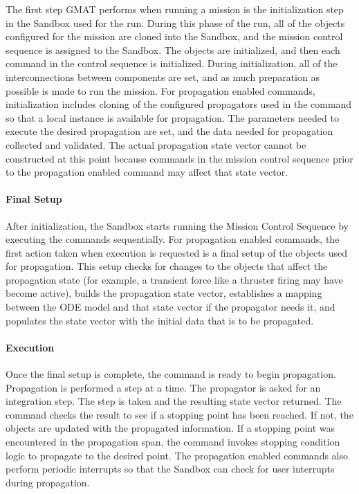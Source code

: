 \documentclass[10pt]{article}
\begin{document}
The first step GMAT performs when running a mission is the initialization step in the Sandbox used for the run.  During this phase of the run, all of the objects configured for the mission are cloned into the Sandbox, and the mission control sequence is assigned to the Sandbox.  The objects are initialized, and then each command in the control sequence is initialized.  During initialization, all of the interconnections between components are set, and as much preparation as possible is made to run the mission.  For propagation enabled commands, initialization includes cloning of the configured propagators used in the command so that a local instance is available for propagation.  The parameters needed to execute the desired propagation are set, and the data needed for propagation collected and validated.  The actual propagation state vector cannot be constructed at this point because commands in the mission control sequence prior to the propagation enabled command may affect that state vector.

\paragraph{Final Setup}

After initialization, the Sandbox starts running the Mission Control Sequence by executing the commands sequentially.  For propagation enabled commands, the first action taken when execution is requested is a final setup of the objects used for propagation.  This setup checks for changes to the objects that affect the propagation state (for example, a transient force like a thruster firing may have become active), builds the propagation state vector, establishes a mapping between the ODE model and that state vector if the propagator needs it, and populates the state vector with the initial data that is to be propagated.

\paragraph{Execution}

Once the final setup is complete, the command is ready to begin propagation.  Propagation is performed a step at a time.  The propagator is asked for an integration step.  The step is taken and the resulting state vector returned.  The command checks the result to see if a stopping point has been reached.  If not, the objects are updated with the propagated information.  If a stopping point was encountered in the propagation span, the command invokes stopping condition logic to propagate to the desired point.  The propagation enabled commands also perform periodic interrupts so that the Sandbox can check for user interrupts during propagation.
\end{document}
